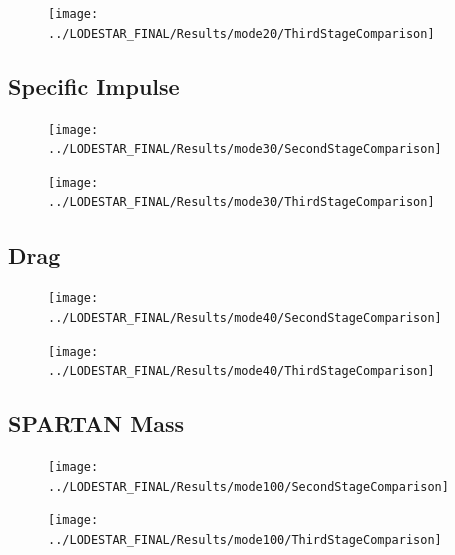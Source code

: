 \begin{figure}[!th]
\centering
\texttt{[image: ../LODESTAR\_FINAL/Results/mode20/ThirdStageComparison]}
\caption{}
\label{fig:ThirdStageComparison1}
\end{figure}
\FloatBarrier
\subsection{Specific Impulse}\label{sec:app_comparison30}


\begin{figure}[!th]
\centering
\texttt{[image: ../LODESTAR\_FINAL/Results/mode30/SecondStageComparison]}
\caption{}
\label{fig:SecondStageComparison2}

\end{figure}
\begin{figure}[!th]
\centering
\texttt{[image: ../LODESTAR\_FINAL/Results/mode30/ThirdStageComparison]}
\caption{}
\label{fig:ThirdStageComparison2}
\end{figure}
\FloatBarrier
\subsection{Drag}\label{sec:app_comparison40}

\begin{figure}[!th]
\centering
\texttt{[image: ../LODESTAR\_FINAL/Results/mode40/SecondStageComparison]}
\caption{}
\label{fig:SecondStageComparison3}
\end{figure}

\begin{figure}[!th]
\centering
\texttt{[image: ../LODESTAR\_FINAL/Results/mode40/ThirdStageComparison]}
\caption{}
\label{fig:ThirdStageComparison3}
\end{figure}
\FloatBarrier
\subsection{SPARTAN Mass}\label{sec:app_comparison100}

\begin{figure}[th]
\centering
\texttt{[image: ../LODESTAR\_FINAL/Results/mode100/SecondStageComparison]}
\caption{}
\label{fig:SecondStageComparison4}
\end{figure}

\begin{figure}[th]
\centering
\texttt{[image: ../LODESTAR\_FINAL/Results/mode100/ThirdStageComparison]}
\caption{}
\label{fig:ThirdStageComparison4}
\end{figure}
\FloatBarrier
